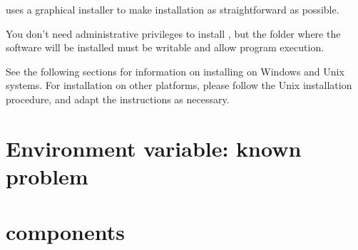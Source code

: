 
\app{} uses a graphical installer to make installation as straightforward as possible. 

You don't need administrative privileges to install \app{}, but the folder where the software will be installed must be writable and allow program execution.

See the following sections for information on installing \app{} on Windows and Unix systems. For installation on  other platforms, please follow the Unix installation procedure, and adapt the instructions as necessary.

\section{Environment variable: known problem}



\section{\app{} components}



